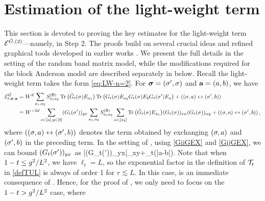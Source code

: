 \section{Estimation of the light-weight term}\label{Sec:graph}

This section is devoted to proving the key estimates for the light-weight term $\cal E^{\Gc,(2)}$---namely,  in Step 2. 
The proofs build on several crucial ideas and refined graphical tools developed in earlier works \cite{yang2021delocalization,yang2022delocalization,yang2021random}. 
We present the full details in the setting of the random band matrix model, while the modifications required for the block Anderson model are described separately in  below. 
Recall the light-weight term takes the form \eqref{eq:LW-n=2}. For $\bsig=(\sig',\sig)$ and $\ba=(a,b)$, we have 
\begin{align}
\mathcal{E}^{\Gc}_{t, \bsig, \ba}&= {W}^d \sum_{a_1, a_2}   S^{(\sB)}_{a_1a_2} 
 \tr \big(\Gc_t(\sig) E_{a_1}\big)\tr\big( G_t(\sig) E_{a_2} G_t(\sig) E_{b} G_t(\sig') E_{a}\big) +\p{(\sig,a)\leftrightarrow (\sig',b)} \label{eq:EGC}\\
 &= W^{-2d} \sum_{x\in [a],y\in [b]} (G_t(\sig'))_{yx} \sum_{a_1, a_2}S^{(\sB)}_{a_1a_2}\sum_{\al \in [a_2]}     
 \tr\big( \Gc_t(\sig) E_{a_1} \big) (G_t(\sig))_{x\al }(G_t(\sig))_{\al y} +\p{(\sig,a)\leftrightarrow (\sig',b)},\nonumber
\end{align} 
where $\p{(\sig,a)\leftrightarrow (\sig',b)}$ denotes the term obtained by exchanging $(\sig,a)$ and $(\sig',b)$ in the preceding term.
In the setting of , using \eqref{GiiGEX} and \eqref{GijGEX}, we can bound $(G_t(\sig'))_{yx}$ as 
\be\label{eq:directG1}
|(G_t(\sig'))_{yx}|\prec  \delta_{xy}+\Psi_t(|a-b|).
\ee 
Note that when $1-t\le \ilambda^2/L^{2}$, we have $\ell_t=L$, so the exponential factor in the definition of $\cal T_t$ in \eqref{defTUL} is always of order 1 for $r\lesssim L$. In this case,  is an immediate consequence of . Hence, for the proof of , we only need to focus on the $1-t> \ilambda^2/L^{2}$ case, where  
